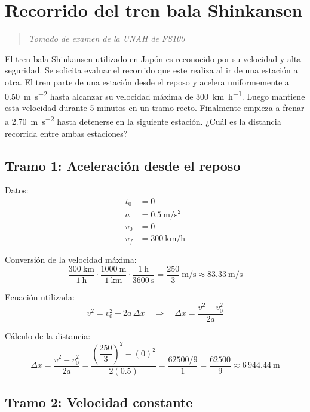 \documentclass{article}
\begin{document}
\maketitle
\newpage

\section{Recorrido del tren bala Shinkansen}

\begin{quote}
    \textit{Tomado de examen de la UNAH de FS100}
\end{quote}

El tren bala Shinkansen utilizado en Japón es reconocido por su velocidad y alta seguridad. Se solicita evaluar el recorrido que este realiza al ir de una estación a otra. El tren parte de una estación desde el reposo y acelera uniformemente a \SI{0.50}{\meter\per\second\squared} hasta alcanzar su velocidad máxima de \SI{300}{\kilo\meter\per\hour}. Luego mantiene esta velocidad durante 5 minutos en un tramo recto. Finalmente empieza a frenar a \SI{2.70}{\meter\per\second\squared} hasta detenerse en la siguiente estación. ¿Cuál es la distancia recorrida entre ambas estaciones?

\subsection*{Tramo 1: Aceleración desde el reposo}

Datos:
\begin{align*}
t_0 &= 0 \\
a &= \SI{0.5}{\meter\per\second\squared} \\
v_0 &= 0 \\
v_f &= \SI{300}{\kilo\meter\per\hour}
\end{align*}

Conversión de la velocidad máxima:
\[
\frac{300\ \text{km}}{1\ \text{h}} \cdot \frac{1000\ \text{m}}{1\ \text{km}} \cdot \frac{1\ \text{h}}{3600\ \text{s}} = \frac{250}{3}\ \text{m/s} \approx 83.33\ \text{m/s}
\]

Ecuación utilizada:
\[
v^2 = v_0^2 + 2a\,\Delta x \quad \Longrightarrow \quad \Delta x = \frac{v^2 - v_0^2}{2a}
\]

Cálculo de la distancia:
\[
\Delta x = \frac{v^2 - v_0^2}{2a} = \frac{{\left(\dfrac{250}{3}\right)}^2 - {(0)}^2}{2(0.5)} = \frac{62500/9}{1} = \frac{62500}{9} \approx 6\,944.44\ \text{m}
\]

\subsection*{Tramo 2: Velocidad constante}
\end{document}
